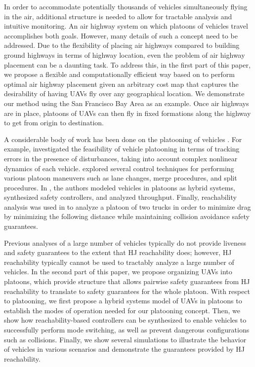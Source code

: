 In order to accommodate potentially thousands of vehicles simultaneously flying in the air, additional structure is needed to allow for tractable analysis and intuitive monitoring. An air highway system on which platoons of vehicles travel accomplishes both goals. However, many details of such a concept need to be addressed. Due to the flexibility of placing air highways compared to building ground highways in terms of highway location, even the problem of air highway placement can be a daunting task. To address this, in the first part of this paper, we propose a flexible and computationally efficient way based on \cite{Sethian96} to perform optimal air highway placement given an arbitrary cost map that captures the desirability of having UAVs fly over any geographical location. We demonstrate our method using the San Francisco Bay Area as an example. Once air highways are in place, platoons of UAVs can then fly in fixed formations along the highway to get from origin to destination.

A considerable body of work has been done on the platooning of vehicles \cite{Kavathekar11}. For example, \cite{McMahon90} investigated the feasibility of vehicle platooning in terms of tracking errors in the presence of disturbances, taking into account complex nonlinear dynamics of each vehicle.  \cite{Hedrick92} explored several control techniques for performing various platoon maneuvers such as lane changes, merge procedures, and split procedures. In \cite{Lygeros98}, the authors modeled vehicles in platoons as hybrid systems, synthesized safety controllers, and analyzed throughput. Finally, reachability analysis was used in \cite{Alam11} to analyze a platoon of two trucks in order to minimize drag by minimizing the following distance while maintaining collision avoidance safety guarantees.

Previous analyses of a large number of vehicles typically do not provide liveness and safety guarantees to the extent that HJ reachability does; however, HJ reachability typically cannot be used to tractably analyze a large number of vehicles. In the second part of this paper, we propose organizing UAVs into platoons, which provide structure that allows pairwise safety guarantees from HJ reachability to translate to safety guarantees for the whole platoon. With respect to platooning, we first propose a hybrid systems model of UAVs in platoons to establish the modes of operation needed for our platooning concept. Then, we show how reachability-based controllers can be synthesized to enable vehicles to successfully perform mode switching, as well as prevent dangerous configurations such as collisions. Finally, we show several simulations to illustrate the behavior of vehicles in various scenarios and demonstrate the guarantees provided by HJ reachability.